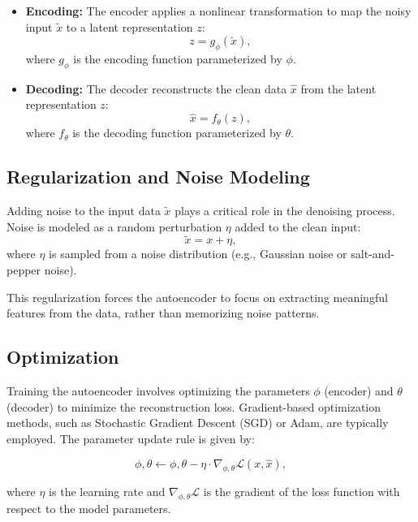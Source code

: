 \documentclass[a4paper,12pt]{article}
\begin{document}
\begin{itemize}
    \item \textbf{Encoding:} The encoder applies a nonlinear transformation to map the noisy input $\tilde{x}$ to a latent representation $z$:
    \begin{equation}
        z = g_\phi(\tilde{x}),
    \end{equation}
    where $g_\phi$ is the encoding function parameterized by $\phi$.
    
    \item \textbf{Decoding:} The decoder reconstructs the clean data $\hat{x}$ from the latent representation $z$:
    \begin{equation}
        \hat{x} = f_\theta(z),
    \end{equation}
    where $f_\theta$ is the decoding function parameterized by $\theta$.
\end{itemize}

\subsection{Regularization and Noise Modeling}
Adding noise to the input data $\tilde{x}$ plays a critical role in the denoising process. Noise is modeled as a random perturbation $\eta$ added to the clean input:
\begin{equation}
    \tilde{x} = x + \eta,
\end{equation}
where $\eta$ is sampled from a noise distribution (e.g., Gaussian noise or salt-and-pepper noise).

This regularization forces the autoencoder to focus on extracting meaningful features from the data, rather than memorizing noise patterns.

\subsection{Optimization}
Training the autoencoder involves optimizing the parameters $\phi$ (encoder) and $\theta$ (decoder) to minimize the reconstruction loss. Gradient-based optimization methods, such as Stochastic Gradient Descent (SGD) or Adam, are typically employed. The parameter update rule is given by:

\begin{equation}
    \phi, \theta \leftarrow \phi, \theta - \eta \cdot \nabla_{\phi, \theta} \mathcal{L}(x, \hat{x}),
\end{equation}

where $\eta$ is the learning rate and $\nabla_{\phi, \theta} \mathcal{L}$ is the gradient of the loss function with respect to the model parameters.
\end{document}
